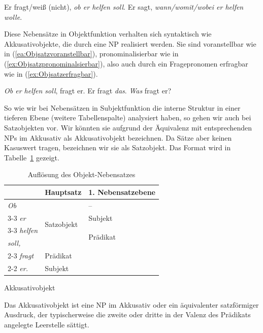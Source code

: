 \ea \label{ea:andereObjeksätz}
\ea \label{ea:obSatz} Er fragt/weiß (nicht), \textit{ob er helfen soll}.
\ex \label{ex:wSatz} Er sagt, \textit{wann/womit/wobei er helfen wolle}.
\z 
\z 

Diese Nebensätze in Objektfunktion verhalten sich syntaktisch wie Akkusativobjekte, die durch eine NP realisiert werden. Sie sind voranstellbar wie in (\ref{ea:Objsatzvoranstellbar}), pronominalisierbar wie in (\ref{ex:Objsatzpronominalsierbar}), also auch durch ein Fragepronomen erfragbar wie in (\ref{ex:Objsatzerfragbar}).

\ea \label{ea:ObjektsatzwieNP}
\ea \label{ea:Objsatzvoranstellbar} \textit{Ob er helfen soll}, fragt er.
\ex \label{ex:Objsatzpronominalsierbar} Er fragt \textit{das}.
\ex \label{ex:Objsatzerfragbar} \textit{Was} fragt er?
\z 
\z 

So wie wir bei Nebensätzen in Subjektfunktion die interne Struktur in einer tieferen Ebene (weitere Tabellenspalte) analysiert haben, so gehen wir auch bei Satzobjekten vor. Wir könnten sie aufgrund der Äquivalenz mit entsprechenden NPs im Akkusativ als Akkusativobjekt bezeichnen. Da Sätze aber keinen Kasuswert tragen, bezeichnen wir sie als Satzobjekt. Das Format wird in Tabelle~\ref{tab:ObjNS} gezeigt.

\begin{table}
  \centering
  \begin{tabular}{l|l|l}
     & Hauptsatz & 1. Nebensatzebene \\
    \hline
    \textit{Ob} & \multirow{4}{*}{Satzobjekt} & -- \\ \cline{3-3}
    \textit{er} & & Subjekt \\ \cline{3-3}
    \textit{helfen} & & \multirow{2}{*}{Prädikat} \\ 
    \textit{soll,} & &  \\ \cline{2-3}
    \textit{fragt} & Prädikat &  \\ \cline{2-2} 
    \textit{er.} & Subjekt &  \\  
    \hline 
  \end{tabular}
  \caption{Auflösung des Objekt-Nebensatzes}
  \label{tab:ObjNS}
\end{table}



\begin{Definition}{Akkusativobjekt}
    
\noindent Das Akkusativobjekt ist eine NP im Akkusativ oder ein äquivalenter satzförmiger Ausdruck, der typischerweise die zweite oder dritte in der Valenz des Prädikats angelegte Leerstelle sättigt.  
\end{Definition}


